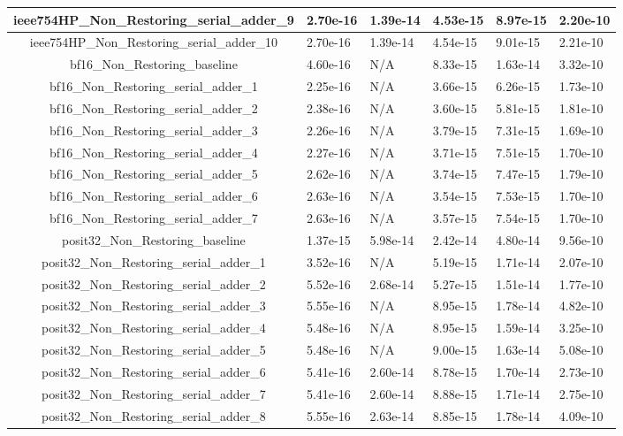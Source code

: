\begin{tabularx}{\linewidth}{|c|X|X|X|X|X|}
ieee754HP\_Non\_Restoring\_serial\_adder\_9 & 2.70e-16 & 1.39e-14 & 4.53e-15 & 8.97e-15 & 2.20e-10\\ \hline
ieee754HP\_Non\_Restoring\_serial\_adder\_10 & 2.70e-16 & 1.39e-14 & 4.54e-15 & 9.01e-15 & 2.21e-10\\ \hline
bf16\_Non\_Restoring\_baseline & 4.60e-16 & N/A & 8.33e-15 & 1.63e-14 & 3.32e-10\\ \hline
bf16\_Non\_Restoring\_serial\_adder\_1 & 2.25e-16 & N/A & 3.66e-15 & 6.26e-15 & 1.73e-10\\ \hline
bf16\_Non\_Restoring\_serial\_adder\_2 & 2.38e-16 & N/A & 3.60e-15 & 5.81e-15 & 1.81e-10\\ \hline
bf16\_Non\_Restoring\_serial\_adder\_3 & 2.26e-16 & N/A & 3.79e-15 & 7.31e-15 & 1.69e-10\\ \hline
bf16\_Non\_Restoring\_serial\_adder\_4 & 2.27e-16 & N/A & 3.71e-15 & 7.51e-15 & 1.70e-10\\ \hline
bf16\_Non\_Restoring\_serial\_adder\_5 & 2.62e-16 & N/A & 3.74e-15 & 7.47e-15 & 1.79e-10\\ \hline
bf16\_Non\_Restoring\_serial\_adder\_6 & 2.63e-16 & N/A & 3.54e-15 & 7.53e-15 & 1.70e-10\\ \hline
bf16\_Non\_Restoring\_serial\_adder\_7 & 2.63e-16 & N/A & 3.57e-15 & 7.54e-15 & 1.70e-10\\ \hline
posit32\_Non\_Restoring\_baseline & 1.37e-15 & 5.98e-14 & 2.42e-14 & 4.80e-14 & 9.56e-10\\ \hline
posit32\_Non\_Restoring\_serial\_adder\_1 & 3.52e-16 & N/A & 5.19e-15 & 1.71e-14 & 2.07e-10\\ \hline
posit32\_Non\_Restoring\_serial\_adder\_2 & 5.52e-16 & 2.68e-14 & 5.27e-15 & 1.51e-14 & 1.77e-10\\ \hline
posit32\_Non\_Restoring\_serial\_adder\_3 & 5.55e-16 & N/A & 8.95e-15 & 1.78e-14 & 4.82e-10\\ \hline
posit32\_Non\_Restoring\_serial\_adder\_4 & 5.48e-16 & N/A & 8.95e-15 & 1.59e-14 & 3.25e-10\\ \hline
posit32\_Non\_Restoring\_serial\_adder\_5 & 5.48e-16 & N/A & 9.00e-15 & 1.63e-14 & 5.08e-10\\ \hline
posit32\_Non\_Restoring\_serial\_adder\_6 & 5.41e-16 & 2.60e-14 & 8.78e-15 & 1.70e-14 & 2.73e-10\\ \hline
posit32\_Non\_Restoring\_serial\_adder\_7 & 5.41e-16 & 2.60e-14 & 8.88e-15 & 1.71e-14 & 2.75e-10\\ \hline
posit32\_Non\_Restoring\_serial\_adder\_8 & 5.55e-16 & 2.63e-14 & 8.85e-15 & 1.78e-14 & 4.09e-10\\ \hline

\end{tabularx}
